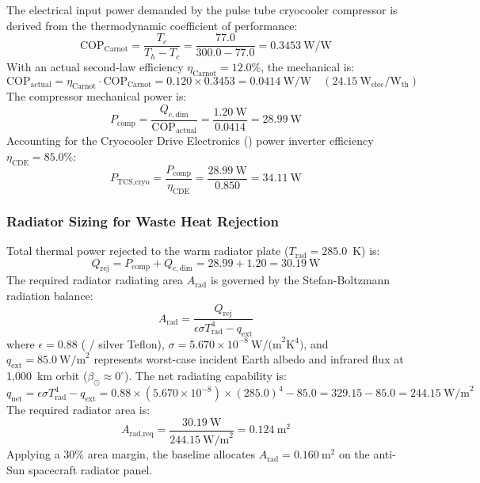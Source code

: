 The electrical input power demanded by the pulse tube cryocooler compressor is derived from the thermodynamic coefficient of performance:
\begin{equation}
    \text{COP}_{\text{Carnot}} = \frac{T_c}{T_h - T_c} = \frac{77.0}{300.0 - 77.0} = 0.3453~\text{W/W}
\end{equation}
With an actual second-law efficiency $\eta_{\text{Carnot}} = 12.0\%$, the mechanical  is:
\begin{equation}
    \text{COP}_{\text{actual}} = \eta_{\text{Carnot}} \cdot \text{COP}_{\text{Carnot}} = 0.120 \times 0.3453 = 0.0414~\text{W/W} \quad (24.15~\text{W}_{\text{elec}}/\text{W}_{\text{th}})
\end{equation}
The compressor mechanical power is:
\begin{equation}
    P_{\text{comp}} = \frac{Q_{c,\text{dim}}}{\text{COP}_{\text{actual}}} = \frac{1.20~\text{W}}{0.0414} = 28.99~\text{W}
\end{equation}
Accounting for the Cryocooler Drive Electronics () power inverter efficiency $\eta_{\text{CDE}} = 85.0\%$:
\begin{equation}
    P_{\text{TCS,cryo}} = \frac{P_{\text{comp}}}{\eta_{\text{CDE}}} = \frac{28.99~\text{W}}{0.850} = 34.11~\text{W}
\end{equation}

\subsubsection{Radiator Sizing for Waste Heat Rejection}

Total thermal power rejected to the warm radiator plate ($T_{\text{rad}} = 285.0$~K) is:
\begin{equation}
    Q_{\text{rej}} = P_{\text{comp}} + Q_{c,\text{dim}} = 28.99 + 1.20 = 30.19~\text{W}
\end{equation}
The required radiator radiating area $A_{\text{rad}}$ is governed by the Stefan-Boltzmann radiation balance:
\begin{equation}
    A_{\text{rad}} = \frac{Q_{\text{rej}}}{\epsilon \sigma T_{\text{rad}}^4 - q_{\text{ext}}}
\end{equation}
where $\epsilon = 0.88$ ( / silver Teflon), $\sigma = 5.670 \times 10^{-8}~\text{W/(m}^2\text{K}^4)$, and $q_{\text{ext}} = 85.0~\text{W/m}^2$ represents worst-case incident Earth albedo and infrared flux at 1,000~km orbit ($\beta_\odot \approx 0^\circ$).
The net radiating capability is:
\begin{equation}
    q_{\text{net}} = \epsilon \sigma T_{\text{rad}}^4 - q_{\text{ext}} = 0.88 \times (5.670 \times 10^{-8}) \times (285.0)^4 - 85.0 = 329.15 - 85.0 = 244.15~\text{W/m}^2
\end{equation}
The required radiator area is:
\begin{equation}
    A_{\text{rad,req}} = \frac{30.19~\text{W}}{244.15~\text{W/m}^2} = 0.124~\text{m}^2
\end{equation}
Applying a $30\%$ area margin, the baseline allocates $A_{\text{rad}} = 0.160~\text{m}^2$ on the anti-Sun spacecraft radiator panel.

